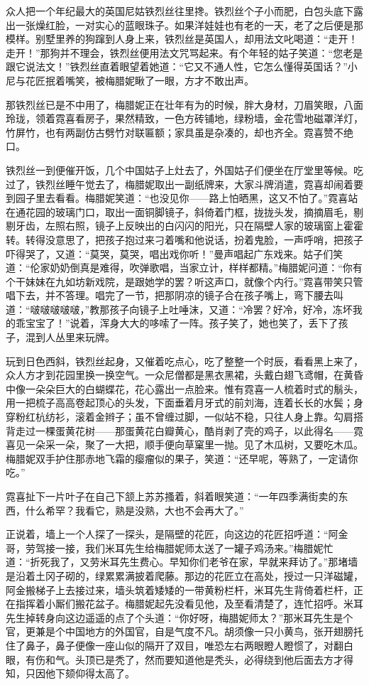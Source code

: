 \par 众人把一个年纪最大的英国尼姑铁烈丝往里搀。铁烈丝个子小而肥，白包头底下露出一张燥红脸，一对实心的蓝眼珠子。如果洋娃娃也有老的一天，老了之后便是那模样。别墅里养的狗蹿到人身上来，铁烈丝是英国人，却用法文叱喝道：“走开！走开！”那狗并不理会，铁烈丝便用法文咒骂起来。有个年轻的姑子笑道：“您老是跟它说法文！”铁烈丝直着眼望着她道：“它又不通人性，它怎么懂得英国话？”小尼与花匠抿着嘴笑，被梅腊妮瞅了一眼，方才不敢出声。
\par 那铁烈丝已是不中用了，梅腊妮正在壮年有为的时候，胖大身材，刀眉笑眼，八面玲珑，领着霓喜看房子，果然精致，一色方砖铺地，绿粉墙，金花雪地磁罩洋灯，竹屏竹，也有两副仿古劈竹对联匾额；家具虽是杂凑的，却也齐全。霓喜赞不绝口。
\par 铁烈丝一到便催开饭，几个中国姑子上灶去了，外国姑子们便坐在厅堂里等候。吃过了，铁烈丝睡午觉去了，梅腊妮取出一副纸牌来，大家斗牌消遣，霓喜却闹着要到园子里去看看。梅腊妮笑道：“也没见你——路上怕晒黑，这又不怕了。”霓喜站在通花园的玻璃门口，取出一面铜脚镜子，斜倚着门框，拢拢头发，摘摘眉毛，剔剔牙齿，左照右照，镜子上反映出的白闪闪的阳光，只在隔壁人家的玻璃窗上霍霍转。转得没意思了，把孩子抱过来刁着嘴和他说话，扮着鬼脸，一声呼哨，把孩子吓得哭了，又道：“莫哭，莫哭，唱出戏你听！”曼声唱起广东戏来。姑子们笑道：“伦家奶奶倒真是难得，吹弹歌唱，当家立计，样样都精。”梅腊妮问道：“你有个干妹妹在九如坊新戏院，是跟她学的罢？听这声口，就像个内行。”霓喜带笑只管唱下去，并不答理。唱完了一节，把那阴凉的镜子合在孩子嘴上，弯下腰去叫道：“啵啵啵啵啵，”教那孩子向镜子上吐唾沫，又道：“冷罢？好冷，好冷，冻坏我的乖宝宝了！”说着，浑身大大的哆嗦了一阵。孩子笑了，她也笑了，丢下了孩子，混到人丛里来玩牌。
\par 玩到日色西斜，铁烈丝起身，又催着吃点心，吃了整整一个时辰，看看黑上来了，众人方才到花园里换一换空气。一众尼僧都是黑衣黑裙，头戴白翅飞鸢帽，在黄昏中像一朵朵巨大的白蝴蝶花，花心露出一点脸来。惟有霓喜一人梳着时式的鬅头，用一把梳子高高卷起顶心的头发，下面垂着月牙式的前刘海，连着长长的水鬓；身穿粉红杭纺衫，滚着金辫子；虽不曾缠过脚，一似站不稳，只往人身上靠。勾肩搭背走过一棵蛋黄花树——那蛋黄花白瓣黄心，酷肖剥了壳的鸡子，以此得名——霓喜见一朵采一朵，聚了一大把，顺手便向草窠里一抛。见了木瓜树，又要吃木瓜。梅腊妮双手护住那赤地飞霜的瘿瘤似的果子，笑道：“还早呢，等熟了，一定请你吃。”
\par 霓喜扯下一片叶子在自己下颔上苏苏搔着，斜着眼笑道：“一年四季满街卖的东西，什么希罕？我看它，熟是没熟，大也不会再大了。”
\par 正说着，墙上一个人探了一探头，是隔壁的花匠，向这边的花匠招呼道：“阿金哥，劳驾接一接，我们米耳先生给梅腊妮师太送了一罐子鸡汤来。”梅腊妮忙道：“折死我了，又劳米耳先生费心。早知你们老爷在家，早就来拜访了。”那堵墙是沿着土冈子砌的，绿累累满披着爬藤。那边的花匠立在高处，授过一只洋磁罐，阿金搬梯子上去接过来，墙头筑着矮矮的一带黄粉栏杆，米耳先生背倚着栏杆，正在指挥着小厮们搬花盆子。梅腊妮起先没看见他，及至看清楚了，连忙招呼。米耳先生掉转身向这边遥遥的点了个头道：“你好呀，梅腊妮师太？”那米耳先生是个官，更兼是个中国地方的外国官，自是气度不凡。胡须像一只小黄鸟，张开翅膀托住了鼻子，鼻子便像一座山似的隔开了双目，唯恐左右两眼瞪人瞪惯了，对翻白眼，有伤和气。头顶已是秃了，然而要知道他是秃头，必得绕到他后面去方才得知，只因他下颏仰得太高了。
